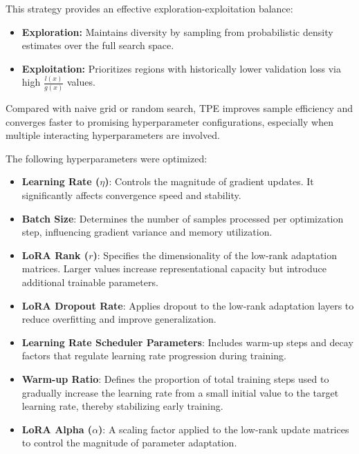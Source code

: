 This strategy provides an effective exploration-exploitation balance:
\begin{itemize}
    \item \textbf{Exploration:} Maintains diversity by sampling from probabilistic density estimates over the full search space.
    \item \textbf{Exploitation:} Prioritizes regions with historically lower validation loss via high $\frac{l(x)}{g(x)}$ values.
\end{itemize}

Compared with naive grid or random search, TPE improves sample efficiency and converges faster to promising hyperparameter configurations, especially when multiple interacting hyperparameters are involved.

The following hyperparameters were optimized:
\begin{itemize}
    \item \textbf{Learning Rate ($\eta$)}: Controls the magnitude of gradient updates. It significantly affects convergence speed and stability.
    
    \item \textbf{Batch Size}: Determines the number of samples processed per optimization step, influencing gradient variance and memory utilization.
    
    \item \textbf{LoRA Rank ($r$)}: Specifies the dimensionality of the low-rank adaptation matrices. Larger values increase representational capacity but introduce additional trainable parameters.
    
    \item \textbf{LoRA Dropout Rate}: Applies dropout to the low-rank adaptation layers to reduce overfitting and improve generalization.
    
    \item \textbf{Learning Rate Scheduler Parameters}: Includes warm-up steps and decay factors that regulate learning rate progression during training.
    
    \item \textbf{Warm-up Ratio}: Defines the proportion of total training steps used to gradually increase the learning rate from a small initial value to the target learning rate, thereby stabilizing early training.
    
    \item \textbf{LoRA Alpha ($\alpha$)}: A scaling factor applied to the low-rank update matrices to control the magnitude of parameter adaptation.
\end{itemize}

